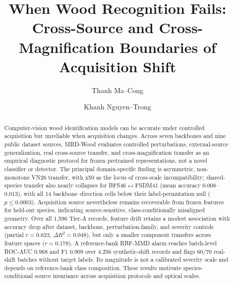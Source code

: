 \documentclass[a4paper,fleqn]{els-cas-templates/cas-sc}
\begin{document}
\let\WriteBookmarks\relax
\setcounter{topnumber}{4}
\setcounter{bottomnumber}{2}
\setcounter{totalnumber}{6}
\renewcommand{\topfraction}{0.95}
\renewcommand{\bottomfraction}{0.85}
\renewcommand{\textfraction}{0.05}
\renewcommand{\floatpagefraction}{0.75}


\title[mode=title]{When Wood Recognition Fails: Cross-Source and Cross-Magnification Boundaries of Acquisition Shift}

\author[1]{Thanh Ma--Cong}

\author[1,2]{Khanh Nguyen--Trong}
\cormark[1]




\begin{abstract}
Computer-vision wood identification models can be accurate under controlled
acquisition but unreliable when acquisition changes. Across seven backbones and
nine public dataset sources, MRD-Wood evaluates controlled perturbations,
external-source generalization, real cross-source transfer, and
cross-magnification transfer as an empirical diagnostic protocol for frozen
pretrained representations, not a novel classifier or detector. The principal
domain-specific finding is asymmetric, non-monotone VN26 transfer, with x50 as
the locus of cross-scale incompatibility; shared-species transfer also nearly
collapses for BFS46$\leftrightarrow$FSDM41 (mean accuracy 0.008--0.013), with
all 14 backbone--direction cells below their label-permutation null
($p\leq0.0003$). Acquisition source nevertheless remains recoverable from
frozen features for held-out species, indicating source-sensitive,
class-conditionally misaligned geometry. Over all 1,596 Tier-A records, feature
drift retains a modest association with accuracy drop after dataset, backbone,
perturbation-family, and severity controls (partial $r=0.623$,
$\Delta R^2=0.048$), but only a smaller component transfers across feature
spaces ($r=0.178$). A reference-bank RBF-MMD alarm
reaches batch-level ROC-AUC 0.968 and F1 0.909 over 4,256 synthetic-shift records
and flags 60/70 real-shift batches without target labels. Its magnitude is not a
calibrated severity scale and depends on reference-bank class composition. These
results motivate species-conditional source invariance across acquisition
protocols and optical scales.
\end{abstract}
\end{document}
